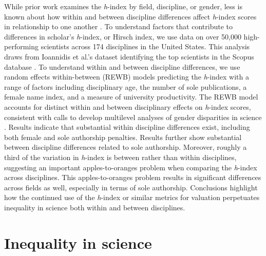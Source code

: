 \documentclass[
  10pt,
  letterpaper,
]{article}
\begin{document}
While prior work examines the \emph{h}-index by field, discipline, or
gender, less is known about how within and between discipline
differences affect \emph{h}-index scores in relationship to one another
\citep{bihari_review_2023}. To understand factors that contribute to
differences in scholar's \emph{h}-index, or Hirsch index, we use data on
over 50,000 high-performing scientists across 174 disciplines in the
United States. This analysis draws from Ioannidis et al.'s dataset
identifying the top scientists in the Scopus database
\citep{ioannidis_standardized_2019}. To understand within and between
discipline differences, we use random effects within-between (REWB)
models predicting the \emph{h}-index with a range of factors including
disciplinary age, the number of sole publications, a female name index,
and a measure of university productivity. The REWB model accounts for
distinct within and between disciplinary effects on \emph{h}-index
scores, consistent with calls to develop multilevel analyses of gender
disparities in science \citep{fox_gender_2020}. Results indicate that
substantial within discipline differences exist, including both female
and sole authorship penalties. Results further show substantial between
discipline differences related to sole authorship. Moreover, roughly a
third of the variation in \emph{h}-index is between rather than within
disciplines, suggesting an important apples-to-oranges problem when
comparing the \emph{h}-index across disciplines. This apples-to-oranges
problem results in significant differences across fields as well,
especially in terms of sole authorship. Conclusions highlight how the
continued use of the \emph{h}-index or similar metrics for valuation
perpetuates inequality in science both within and between disciplines.

\hypertarget{inequality-in-science}{%
\section{Inequality in science}\label{inequality-in-science}}
\end{document}
